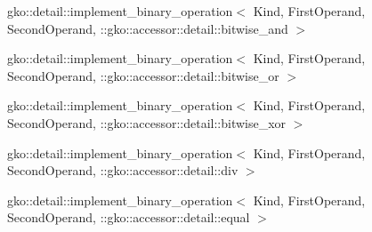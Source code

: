 \begin{DoxyCompactList}
\begin{DoxyCompactList}
\item {}
\end{DoxyCompactList}
\item gko\+:\+:detail\+:\+:implement\+\_\+binary\+\_\+operation$<$ Kind, First\+Operand, Second\+Operand, \+:\+:gko\+:\+:accessor\+:\+:detail\+:\+:bitwise\+\_\+and $>$\begin{DoxyCompactList}
\item {}
\end{DoxyCompactList}
\item gko\+:\+:detail\+:\+:implement\+\_\+binary\+\_\+operation$<$ Kind, First\+Operand, Second\+Operand, \+:\+:gko\+:\+:accessor\+:\+:detail\+:\+:bitwise\+\_\+or $>$\begin{DoxyCompactList}
\item {}
\end{DoxyCompactList}
\item gko\+:\+:detail\+:\+:implement\+\_\+binary\+\_\+operation$<$ Kind, First\+Operand, Second\+Operand, \+:\+:gko\+:\+:accessor\+:\+:detail\+:\+:bitwise\+\_\+xor $>$\begin{DoxyCompactList}
\item {}
\end{DoxyCompactList}
\item gko\+:\+:detail\+:\+:implement\+\_\+binary\+\_\+operation$<$ Kind, First\+Operand, Second\+Operand, \+:\+:gko\+:\+:accessor\+:\+:detail\+:\+:div $>$\begin{DoxyCompactList}
\item {}
\end{DoxyCompactList}
\item gko\+:\+:detail\+:\+:implement\+\_\+binary\+\_\+operation$<$ Kind, First\+Operand, Second\+Operand, \+:\+:gko\+:\+:accessor\+:\+:detail\+:\+:equal $>$\begin{DoxyCompactList}

\end{DoxyCompactList}
\end{DoxyCompactList}
